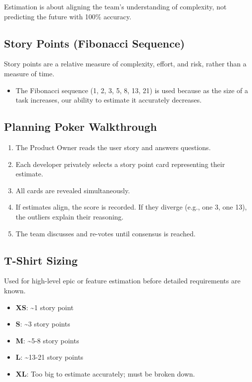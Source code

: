 Estimation is about aligning the team's understanding of complexity, not
predicting the future with 100\% accuracy.

\subsection{Story Points (Fibonacci
Sequence)}\label{story-points-fibonacci-sequence}

Story points are a relative measure of complexity, effort, and risk,
rather than a measure of time.

\begin{itemize}
\tightlist
\item
  The Fibonacci sequence (1, 2, 3, 5, 8, 13, 21) is used because as the
  size of a task increases, our ability to estimate it accurately
  decreases.
\end{itemize}

\subsection{Planning Poker
Walkthrough}\label{planning-poker-walkthrough}

\begin{enumerate}
\def\labelenumi{\arabic{enumi}.}
\tightlist
\item
  The Product Owner reads the user story and answers questions.
\item
  Each developer privately selects a story point card representing their
  estimate.
\item
  All cards are revealed simultaneously.
\item
  If estimates align, the score is recorded. If they diverge (e.g., one
  3, one 13), the outliers explain their reasoning.
\item
  The team discusses and re-votes until consensus is reached.
\end{enumerate}

\subsection{T-Shirt Sizing}\label{t-shirt-sizing}

Used for high-level epic or feature estimation before detailed
requirements are known.

\begin{itemize}
\tightlist
\item
  \textbf{XS}: \textasciitilde1 story point
\item
  \textbf{S}: \textasciitilde3 story points
\item
  \textbf{M}: \textasciitilde5-8 story points
\item
  \textbf{L}: \textasciitilde13-21 story points
\item
  \textbf{XL}: Too big to estimate accurately; must be broken down.
\end{itemize}

